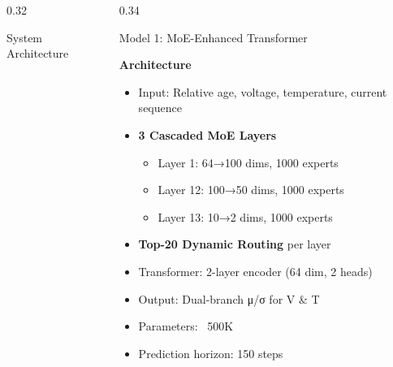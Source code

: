 \documentclass[final]{beamer}
\begin{document}
\begin{frame}[t]
\begin{columns}[t]
\begin{column}{0.32\textwidth}
\begin{block}{System Architecture}
\begin{center}

\end{center}

\end{block}

\end{column}


\begin{column}{0.34\textwidth}

\begin{block}{Model 1: MoE-Enhanced Transformer}

\textbf{Architecture}

\begin{itemize}
\item Input: Relative age, voltage, temperature, current sequence
\item \textbf{3 Cascaded MoE Layers}
\begin{itemize}
\item Layer 1: 64→100 dims, 1000 experts
\item Layer 12: 100→50 dims, 1000 experts
\item Layer 13: 10→2 dims, 1000 experts
\end{itemize}
\item \textbf{Top-20 Dynamic Routing} per layer
\item Transformer: 2-layer encoder (64 dim, 2 heads)
\item Output: Dual-branch μ/σ for V \& T
\item Parameters: ~500K
\item Prediction horizon: 150 steps
\end{itemize}


\end{block}
\end{column}
\end{columns}
\end{frame}
\end{document}
